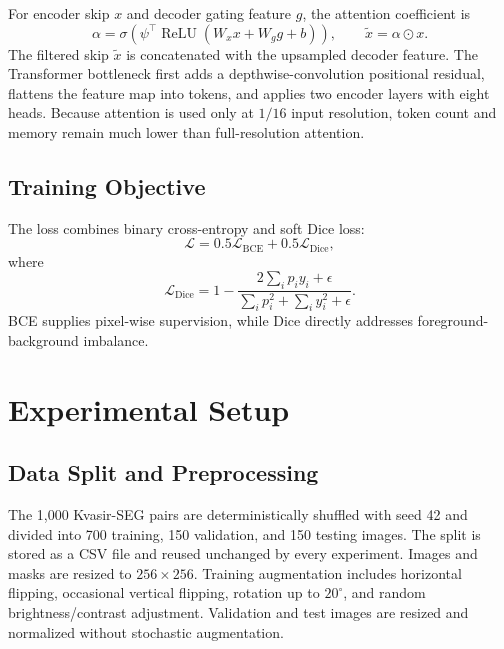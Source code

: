 \documentclass[a4paper,10pt]{article}
\begin{document}
For encoder skip $x$ and decoder gating feature $g$, the attention coefficient is
\begin{equation}
\alpha=\sigma\left(\psi^{\top}\operatorname{ReLU}(W_xx+W_gg+b)\right),
\qquad \tilde{x}=\alpha\odot x.
\end{equation}
The filtered skip $\tilde{x}$ is concatenated with the upsampled decoder feature. The Transformer bottleneck first adds a depthwise-convolution positional residual, flattens the feature map into tokens, and applies two encoder layers with eight heads. Because attention is used only at $1/16$ input resolution, token count and memory remain much lower than full-resolution attention.

\subsection{Training Objective}

The loss combines binary cross-entropy and soft Dice loss:
\begin{equation}
\mathcal{L}=0.5\mathcal{L}_{\mathrm{BCE}}+0.5\mathcal{L}_{\mathrm{Dice}},
\end{equation}
where
\begin{equation}
\mathcal{L}_{\mathrm{Dice}}=1-\frac{2\sum_i p_i y_i+\epsilon}{\sum_i p_i^2+\sum_i y_i^2+\epsilon}.
\end{equation}
BCE supplies pixel-wise supervision, while Dice directly addresses foreground-background imbalance.

\FloatBarrier
{}
\section{Experimental Setup}
\label{sec:experiments}

\subsection{Data Split and Preprocessing}

The 1,000 Kvasir-SEG pairs are deterministically shuffled with seed 42 and divided into 700 training, 150 validation, and 150 testing images. The split is stored as a CSV file and reused unchanged by every experiment. Images and masks are resized to $256\times256$. Training augmentation includes horizontal flipping, occasional vertical flipping, rotation up to $20^{\circ}$, and random brightness/contrast adjustment. Validation and test images are resized and normalized without stochastic augmentation.
\end{document}
